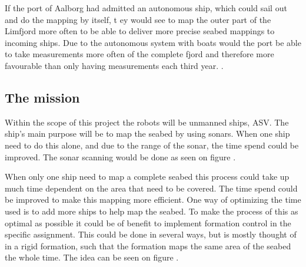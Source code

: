 If the port of Aalborg had admitted an autonomous ship, which could sail out and do the mapping by itself, t ey would see to map the outer part of the Limfjord more often to be able to deliver more precise seabed mappings to incoming ships. Due to the autonomous system with boats would the port be able to take measurements more often of the complete fjord and therefore more favourable than only having measurements each third year. \cite{portofaalborg}.

\subsection{The mission}
Within the scope of this project the robots will be unmanned ships, \ac{ASV}. The ship's main purpose will be to map the seabed by using sonars. When one ship need to do this alone, and due to the range of the sonar, the time spend could be improved. The sonar scanning would be done as seen on figure .

When only one ship need to map a complete seabed this process could take up much time dependent on the area that need to be covered. The time spend could be improved to make this mapping more efficient. One way of optimizing the time used is to add more ships to help map the seabed. To make the process of this as optimal as possible it could be of benefit to implement formation control in the specific assignment. This could be done in several ways, but is mostly thought of in a rigid formation, such that the formation maps the same area of the seabed the whole time. The idea can be seen on figure .

